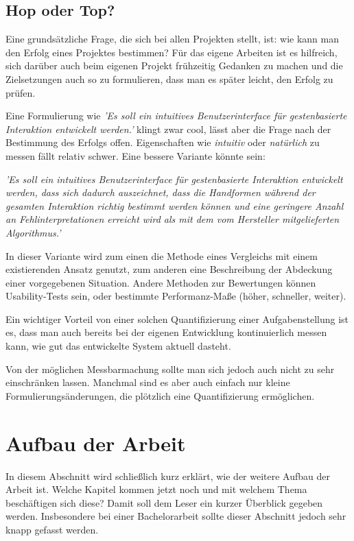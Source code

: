 \subsection{Hop oder Top?}
Eine grundsätzliche Frage, die sich bei allen Projekten stellt, ist: wie kann man den Erfolg eines Projektes bestimmen? Für das eigene Arbeiten ist es hilfreich, sich darüber auch beim eigenen Projekt frühzeitig Gedanken zu machen und die Zielsetzungen auch so zu formulieren, dass man es später leicht, den Erfolg zu prüfen.

Eine Formulierung wie {\em 'Es soll ein intuitives Benutzerinterface für gestenbasierte Interaktion entwickelt werden.'} klingt zwar cool, lässt aber die Frage nach der Bestimmung des Erfolgs offen. Eigenschaften wie {\em intuitiv} oder {\em natürlich} zu messen fällt relativ schwer. Eine bessere Variante könnte sein: 

{\em 'Es soll ein intuitives Benutzerinterface für gestenbasierte Interaktion entwickelt werden, dass sich dadurch auszeichnet, dass die Handformen während der gesamten Interaktion richtig bestimmt werden können und eine geringere Anzahl an Fehlinterpretationen erreicht wird als mit dem vom Hersteller mitgelieferten Algorithmus.'}

In dieser Variante wird zum einen die Methode eines Vergleichs mit einem existierenden Ansatz genutzt, zum anderen eine Beschreibung der Abdeckung einer vorgegebenen Situation. Andere Methoden zur Bewertungen können Usability-Tests sein, oder bestimmte Performanz-Maße (höher, schneller, weiter).

Ein wichtiger Vorteil von einer solchen Quantifizierung einer Aufgabenstellung ist es, dass man auch bereits bei der eigenen Entwicklung kontinuierlich messen kann, wie gut das entwickelte System aktuell dasteht.

Von der möglichen Messbarmachung sollte man sich jedoch auch nicht zu sehr einschränken lassen. Manchmal sind es aber auch einfach nur kleine Formulierungsänderungen, die plötzlich eine Quantifizierung ermöglichen.

\section{Aufbau der Arbeit}

In diesem Abschnitt wird schließlich kurz erklärt, wie der weitere Aufbau der Arbeit ist. Welche Kapitel kommen jetzt noch und mit welchem Thema beschäftigen sich diese? Damit soll dem Leser ein kurzer Überblick gegeben werden. Insbesondere bei einer Bachelorarbeit sollte dieser Abschnitt jedoch sehr knapp gefasst werden.
